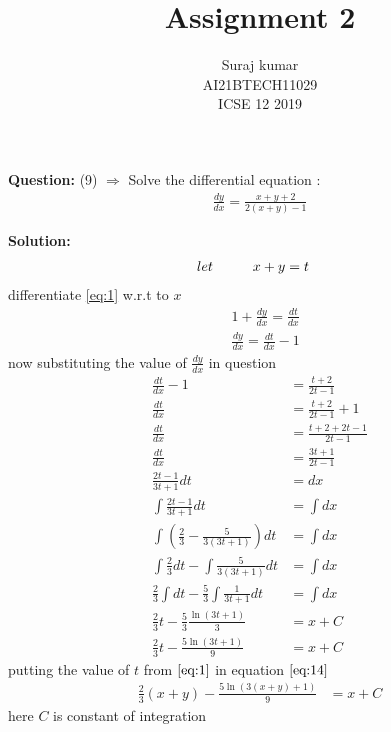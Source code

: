 \documentclass[journal,12pt,twocolumn]{IEEEtran}
\title{Assignment 2}
\author{Suraj kumar \\ \normalsize AI21BTECH11029\\ \Large ICSE 12 2019 }
\newcommand{\question}{\noindent \textbf{Question: }}
\newcommand{\solution}{\noindent \textbf{Solution: }}
\begin{document}
\maketitle
\question (9) $\Rightarrow$ Solve the differential equation :
\begin{align*}
	\frac{dy}{dx}=\frac{x+y+2}{2(x+y)-1}
\end{align*}

\solution
\begin{align}
	let \hspace{10mm} & x+y=t\label{eq:1}
\end{align}
differentiate \eqref{eq:1} w.r.t to $x$
\begin{align}
	 & 1+\frac{dy}{dx}=\frac{dt}{dx} \\
	 & \frac{dy}{dx}=\frac{dt}{dx}-1
\end{align}
now substituting the value of $\frac{dy}{dx}$ in question
\begin{align}
	\frac{dt}{dx}-1                                      & =\frac{t+2}{2t-1}      \\
	\frac{dt}{dx}                                        & =\frac{t+2}{2t-1}+1    \\
	\frac{dt}{dx}                                        & =\frac{t+2+2t-1}{2t-1} \\
	\frac{dt}{dx}                                        & =\frac{3t+1}{2t-1}     \\
	\frac{2t-1}{3t+1}dt                                  & =dx                    \\
	\int \frac{2t-1}{3t+1}dt                             & =\int dx               \\
	\int \left( \frac{2}{3}-\frac{5}{3(3t+1)} \right)dt  & =\int dx               \\
	\int \frac{2}{3}dt- \int \frac{5}{3(3t+1)}dt         & =\int dx               \\
	\frac{2}{3}\int dt-\frac{5}{3} \int \frac{1}{3t+1}dt & =\int dx               \\
	\frac{2}{3} t-\frac{5}{3}\frac{\ln{(3t+1)}}{3}       & =x+C                   \\
	\frac{2}{3} t-\frac{5\ln{(3t+1)}}{9}                 & =x+C\label{eq:14}
\end{align}
putting the value of $t$ from $\eqref{eq:1}$ in equation $\eqref{eq:14}$
\begin{align}
	\frac{2}{3}(x+y)-\frac{5\ln(3(x+y)+1)}{9} & =x+C
\end{align}
here $C$ is constant of integration
\end{document}
